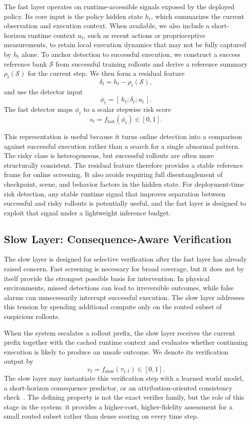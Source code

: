 The fast layer operates on runtime-accessible signals exposed by the
deployed policy.
Its core input is the policy hidden state $h_t$, which summarizes the
current observation and execution context.
When available, we also include a short-horizon runtime context
$u_t$, such as recent actions or proprioceptive measurements, to retain
local execution dynamics that may not be fully captured by $h_t$
alone.
To anchor detection to successful execution, we construct a success
reference bank $\mathcal{S}$ from successful training rollouts and
derive a reference summary $\rho_t(\mathcal{S})$ for the current step.
We then form a residual feature
\[
  \delta_t = h_t - \rho_t(\mathcal{S}),
\]
and use the detector input
\[
  \phi_t = [\,h_t;\delta_t;u_t\,].
\]
The fast detector maps $\phi_t$ to a scalar stepwise risk score
\[
  s_t = f_{\mathrm{fast}}(\phi_t) \in [0,1].
\]

This representation is useful because it turns online detection into a
comparison against successful execution rather than a search for a
single abnormal pattern.
The risky class is heterogeneous, but successful rollouts are often
more structurally consistent.
The residual feature therefore provides a stable reference frame for
online screening.
It also avoids requiring full disentanglement of checkpoint, scene, and
behavior factors in the hidden state.
For deployment-time risk detection, any stable runtime signal that
improves separation between successful and risky rollouts is potentially
useful, and the fast layer is designed to exploit that signal under a
lightweight inference budget.

\subsection{Slow Layer: Consequence-Aware Verification}

The slow layer is designed for selective verification after the fast
layer has already raised concern.
Fast screening is necessary for broad coverage, but it does not by
itself provide the strongest possible basis for intervention.
In physical environments, missed detections can lead to irreversible
outcomes, while false alarms can unnecessarily interrupt successful
execution.
The slow layer addresses this tension by spending additional compute
only on the routed subset of suspicious rollouts.

When the system escalates a rollout prefix, the slow layer receives the
current prefix together with the cached runtime context and evaluates
whether continuing execution is likely to produce an unsafe outcome.
We denote its verification output by
\[
  v_t = f_{\mathrm{slow}}(\tau_{1:t}) \in [0,1].
\]
The slow layer may instantiate this verification step with a learned
world model, a short-horizon consequence predictor, or an
attribution-oriented consistency check~\citep{ha2018world,daydreamer}.
The defining property is not the exact verifier family, but the role of
this stage in the system: it provides a higher-cost, higher-fidelity
assessment for a small routed subset rather than dense scoring on every
time step.

